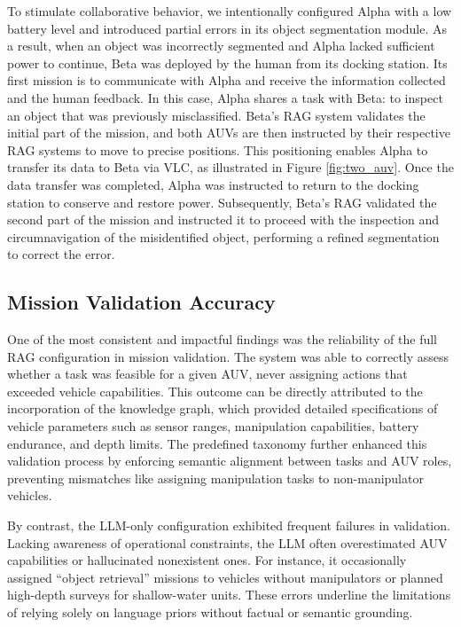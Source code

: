 To stimulate collaborative behavior, we intentionally configured Alpha with a low battery level and introduced partial errors in its object segmentation module. As a result, when an object was incorrectly segmented and Alpha lacked sufficient power to continue, Beta was deployed by the human from its docking station. Its first mission is to communicate with Alpha and receive the information collected and the human feedback. In this case, Alpha shares a task with Beta: to inspect an object that was previously misclassified. Beta’s RAG system validates the initial part of the mission, and both AUVs are then instructed by their respective RAG systems to move to precise positions. This positioning enables Alpha to transfer its data to Beta via VLC, as illustrated in Figure \ref{fig:two_auv}. Once the data transfer was completed, Alpha was instructed to return to the docking station to conserve and restore power. Subsequently, Beta's RAG validated the second part of the mission and instructed it to proceed with the inspection and circumnavigation of the misidentified object, performing a refined segmentation to correct the error.








\subsection{Mission Validation Accuracy}
One of the most consistent and impactful findings was the reliability of the full RAG configuration in mission validation. The system was able to correctly assess whether a task was feasible for a given AUV, never assigning actions that exceeded vehicle capabilities. This outcome can be directly attributed to the incorporation of the knowledge graph, which provided detailed specifications of vehicle parameters such as sensor ranges, manipulation capabilities, battery endurance, and depth limits. The predefined taxonomy further enhanced this validation process by enforcing semantic alignment between tasks and AUV roles, preventing mismatches like assigning manipulation tasks to non-manipulator vehicles.

By contrast, the LLM-only configuration exhibited frequent failures in validation. Lacking awareness of operational constraints, the LLM often overestimated AUV capabilities or hallucinated nonexistent ones. For instance, it occasionally assigned ``object retrieval'' missions to vehicles without manipulators or planned high-depth surveys for shallow-water units. These errors underline the limitations of relying solely on language priors without factual or semantic grounding.

